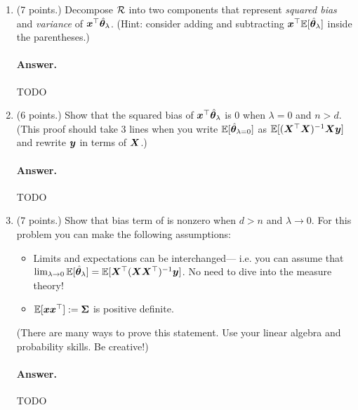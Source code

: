 \documentclass[11pt,letterpaper]{article}
\newenvironment{answer}{%
    \vspace{1em}
    \color{black}
    \paragraph{Answer.}
  }{%
    \vspace{1em}
  }
\begin{document}
\begin{enumerate}
  \item (7 points.) Decompose $\mathcal{R}$ into two components that represent \emph{squared bias} and \emph{variance} of ${\bm{x}}^\top \hat{{\bm{\theta}}}_\lambda$.
    (Hint: consider adding and subtracting ${\bm{x}}^\top \mathbb{E}[\hat{{\bm{\theta}}}_\lambda]$ inside the parentheses.)

\begin{answer}
  TODO
\end{answer}

  \item (6 points.) Show that the squared bias of ${\bm{x}}^\top \hat{{\bm{\theta}}}_\lambda$ is 0 when $\lambda = 0$ and $n > d$.
    (This proof should take 3 lines when you write $\mathbb{E}[\hat{{\bm{\theta}}}_{\lambda=0}]$ as $\mathbb{E}[({\bm{X}}^\top{\bm{X}})^{-1}{\bm{X}}{\bm{y}}]$ and rewrite ${\bm{y}}$ in terms of ${\bm{X}}$.)

\begin{answer}
  TODO
\end{answer}

  \item (7 points.) Show that bias term of is nonzero when $d > n$ and $\lambda \to 0$.
    For this problem you can make the following assumptions:
    \begin{itemize}
      \item Limits and expectations can be interchanged---
        i.e. you can assume that $\lim_{\lambda \to 0} \mathbb{E}[\hat{{\bm{\theta}}}_\lambda] = \mathbb{E}[ {\bm{X}}^\top ({\bm{X}} {\bm{X}}^\top)^{-1} {\bm{y}}]$.
        No need to dive into the measure theory!
      \item $\mathbb{E}[{\bm{x}} {\bm{x}}^\top] := {\bm{\Sigma}}$ is positive definite.
    \end{itemize}

    (There are many ways to prove this statement. Use your linear algebra and probability skills. Be creative!)


\begin{answer}
  TODO
\end{answer}

\end{enumerate}
\end{document}
